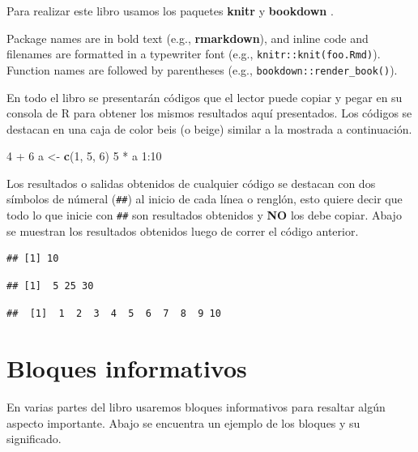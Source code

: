 \documentclass[10pt,]{krantz}
\makeatletter
\newenvironment{Shaded}{\begin{snugshade}}{\end{snugshade}}
\newcommand{\KeywordTok}[1]{\textcolor[rgb]{0.13,0.29,0.53}{\textbf{{#1}}}}
\newcommand{\DecValTok}[1]{\textcolor[rgb]{0.00,0.00,0.81}{{#1}}}
\newcommand{\StringTok}[1]{\textcolor[rgb]{0.31,0.60,0.02}{{#1}}}
\newcommand{\NormalTok}[1]{{#1}}
\let\proglang=\textsf
\newenvironment{kframe}{%
\medskip{}
\setlength{\fboxsep}{.8em}
 \def\at@end@of@kframe{}%
 \ifinner\ifhmode%
  \def\at@end@of@kframe{\end{minipage}}%
  \begin{minipage}{\columnwidth}%
 \fi\fi%
 \def\FrameCommand##1{\hskip\@totalleftmargin \hskip-\fboxsep
 \colorbox{shadecolor}{##1}\hskip-\fboxsep
     \hskip-\linewidth \hskip-\@totalleftmargin \hskip\columnwidth}%
 \MakeFramed {\advance\hsize-\width
   \@totalleftmargin\z@ \linewidth\hsize
   \@setminipage}}%
 {\par\unskip\endMakeFramed%
 \at@end@of@kframe}
\renewenvironment{Shaded}{\begin{kframe}}{\end{kframe}}
\makeatother
\begin{document}
Para realizar este libro usamos los paquetes \textbf{knitr}
\citep{xie2015} y \textbf{bookdown} \citep{R-bookdown}.

Package names are in bold text (e.g., \textbf{rmarkdown}), and inline
code and filenames are formatted in a typewriter font (e.g.,
\texttt{knitr::knit(\textquotesingle{}foo.Rmd\textquotesingle{})}).
Function names are followed by parentheses (e.g.,
\texttt{bookdown::render\_book()}).

En todo el libro se presentarán códigos que el lector puede copiar y
pegar en su consola de \proglang{R} para obtener los mismos resultados
aquí presentados. Los códigos se destacan en una caja de color beis (o
beige) similar a la mostrada a continuación.

\begin{Shaded}
\begin{Highlighting}[]
\DecValTok{4} \NormalTok{+}\StringTok{ }\DecValTok{6}
\NormalTok{a <-}\StringTok{ }\KeywordTok{c}\NormalTok{(}\DecValTok{1}\NormalTok{, }\DecValTok{5}\NormalTok{, }\DecValTok{6}\NormalTok{)}
\DecValTok{5} \NormalTok{*}\StringTok{ }\NormalTok{a}
\DecValTok{1}\NormalTok{:}\DecValTok{10}
\end{Highlighting}
\end{Shaded}

Los resultados o salidas obtenidos de cualquier código se destacan con
dos símbolos de númeral (\texttt{\#\#}) al inicio de cada línea o
renglón, esto quiere decir que todo lo que inicie con \texttt{\#\#} son
resultados obtenidos y \textbf{NO} los debe copiar. Abajo se muestran
los resultados obtenidos luego de correr el código anterior.

\begin{verbatim}
## [1] 10
\end{verbatim}

\begin{verbatim}
## [1]  5 25 30
\end{verbatim}

\begin{verbatim}
##  [1]  1  2  3  4  5  6  7  8  9 10
\end{verbatim}

\section*{Bloques informativos}\label{bloques-informativos}


En varias partes del libro usaremos bloques informativos para resaltar
algún aspecto importante. Abajo se encuentra un ejemplo de los bloques y
su significado.
\end{document}
